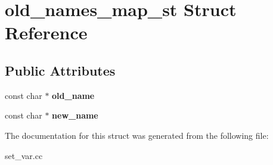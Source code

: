 \hypertarget{structold__names__map__st}{}\section{old\+\_\+names\+\_\+map\+\_\+st Struct Reference}
\label{structold__names__map__st}
\subsection*{Public Attributes}
\begin{DoxyCompactItemize}
\item 
\mbox{\label{structold__names__map__st_afcdfb0dadc226f2e626c7819fad2888f}} 
const char $\ast$ {\bfseries old\+\_\+name}
\item 
\mbox{\label{structold__names__map__st_ac28332f88308a83376dcf68cc4cac303}} 
const char $\ast$ {\bfseries new\+\_\+name}
\end{DoxyCompactItemize}


The documentation for this struct was generated from the following file\+:\begin{DoxyCompactItemize}
\item 
set\+\_\+var.\+cc\end{DoxyCompactItemize}
